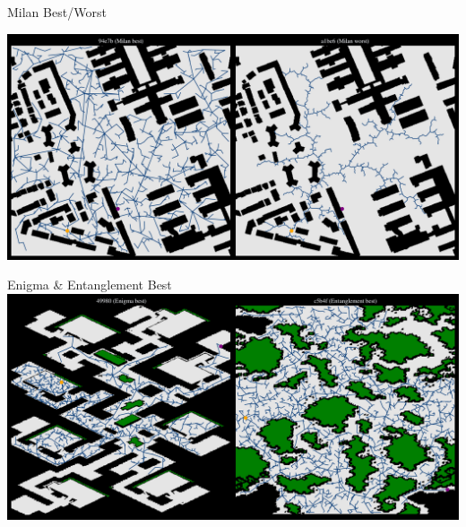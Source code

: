 \documentclass[aspectratio=169]{beamer}
\begin{document}
\begin{frame}{Milan Best/Worst}
    
    \includegraphics[width=1.0\linewidth, keepaspectratio]{figures/learned_split_0.pdf}
\end{frame}

\begin{frame}{Enigma \& Entanglement Best}
    \centering
    \vspace{-0.1}
    \includegraphics[width=1.0\linewidth, keepaspectratio]{figures/learned_split_1.pdf}
\end{frame}
\end{document}
